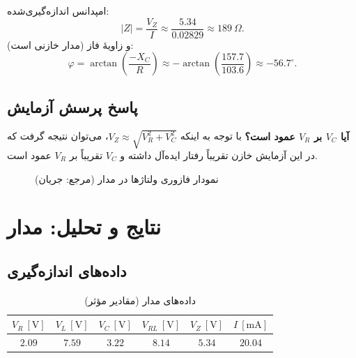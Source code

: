 \documentclass[a4paper,11pt]{article}
\newcommand{\abs}[1]{\left|#1\right|}
\begin{document}
امپدانس اندازه‌گیری‌شده:
\[
\abs{Z}=\frac{V_Z}{I}\approx \frac{5.34}{0.02829}\approx 189~\Omega.
\]
و زاویهٔ فاز (مدار خازنی است):
\[
\varphi=\arctan\!\left(\frac{-X_C}{R}\right)\approx -\arctan\!\left(\frac{157.7}{103.6}\right)\approx -56.7^\circ.
\]

\subsection{پاسخ پرسش آزمایش}
\textbf{آیا $V_C$ بر $V_R$ عمود است؟} با توجه به اینکه $V_Z \approx \sqrt{V_R^2+V_C^2}$، می‌توان نتیجه گرفت که در این آزمایش خازن تقریباً رفتار ایده‌آل داشته و $V_C$ تقریباً بر $V_R$ عمود است.

\begin{figure}[h!]
\caption{نمودار فازوری ولتاژها در مدار  (مرجع: جریان)}
\label{fig:phasorRC}
\centering
\def\sc{0.8}
\end{figure}

\section{نتایج و تحلیل: مدار }
\subsection{داده‌های اندازه‌گیری}
\begin{table}[h!]
\centering
\caption{داده‌های مدار  (مقادیر مؤثر)}
\label{tab:RLC}
\begin{tabular}{cccccc}
\toprule
$V_R~[\mathrm{V}]$ & $V_L~[\mathrm{V}]$ & $V_C~[\mathrm{V}]$ & $V_{RL}~[\mathrm{V}]$ & $V_Z~[\mathrm{V}]$ & $I~[\mathrm{mA}]$ \\
\midrule
$2.09$ & $7.59$ & $3.22$ & $8.14$ & $5.34$ & $20.04$ \\
\bottomrule
\end{tabular}
\end{table}
\end{document}
